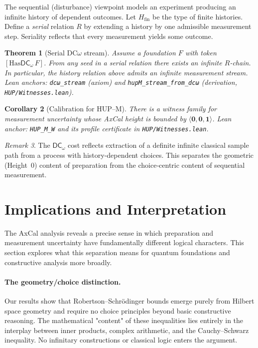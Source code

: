 \documentclass[11pt]{article}
\newcommand{\DCw}{\mathsf{DC}_{\omega}}
\newcommand{\hzero}{\mathbf{0}}
\newcommand{\hone}{\mathbf{1}}
\newcommand{\DCwonly}{\langle \hzero,\hzero,\hone\rangle}
\newcommand{\lean}[1]{\texttt{#1}}
\newcommand{\leanaxiom}{\text{\tiny [Axiom]}}
\newcommand{\leanpartial}{\text{\tiny [Lean-partial]}}
\theoremstyle{plain}
\newtheorem{theorem}{Theorem}[section]
\newtheorem{corollary}[theorem]{Corollary}
\theoremstyle{definition}
\theoremstyle{remark}
\newtheorem{remark}[theorem]{Remark}
\begin{document}
The sequential (disturbance) viewpoint models an experiment producing an infinite history of dependent outcomes.
Let $H_{\mathrm{fin}}$ be the type of finite histories. Define a \emph{serial} relation $R$ by extending a history by one admissible measurement step. Seriality reflects that every measurement yields some outcome.

\begin{theorem}[Serial DC$\omega$ stream]\leanaxiom
\label{thm:dcomega}
Assume a foundation $F$ with token $[\mathrm{Has}\DCw\,F]$.
From any seed in a serial relation there exists an infinite $R$-chain. In particular, the history relation above admits an infinite measurement stream.
\emph{Lean anchors:} \lean{dcω\_stream} (axiom) and \lean{hupM\_stream\_from\_dcω} (derivation, \texttt{HUP/Witnesses.lean}).
\end{theorem}

\begin{corollary}[Calibration for HUP--M]\leanpartial
\label{cor:HUPM}
There is a witness family for measurement uncertainty whose AxCal height is bounded by $\DCwonly$.
\emph{Lean anchor:} \lean{HUP\_M\_W} and its profile certificate in \texttt{HUP/Witnesses.lean}.
\end{corollary}

\begin{remark}
The $\DCw$ cost reflects extraction of a definite infinite classical sample path from a process with history-dependent choices.
This separates the geometric (Height~0) content of preparation from the choice‑centric content of sequential measurement.
\end{remark}

\section{Implications and Interpretation}
\label{sec:implications}

The AxCal analysis reveals a precise sense in which preparation and measurement uncertainty have fundamentally different logical characters. This section explores what this separation means for quantum foundations and constructive analysis more broadly.

\paragraph{The geometry/choice distinction.}
Our results show that Robertson--Schrödinger bounds emerge purely from Hilbert space geometry and require no choice principles beyond basic constructive reasoning. The mathematical "content" of these inequalities lies entirely in the interplay between inner products, complex arithmetic, and the Cauchy--Schwarz inequality. No infinitary constructions or classical logic enters the argument.
\end{document}
